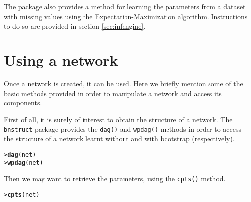 \documentclass{article}\usepackage[]{graphicx}\usepackage[]{color}
\makeatletter
\newcommand{\hlstd}[1]{\textcolor[rgb]{0.345,0.345,0.345}{#1}}%
\newcommand{\hlkwd}[1]{\textcolor[rgb]{0.737,0.353,0.396}{\textbf{#1}}}%
\newenvironment{kframe}{%
 \def\at@end@of@kframe{}%
 \ifinner\ifhmode%
  \def\at@end@of@kframe{\end{minipage}}%
  \begin{minipage}{\columnwidth}%
 \fi\fi%
 \def\FrameCommand##1{\hskip\@totalleftmargin \hskip-\fboxsep
 \colorbox{shadecolor}{##1}\hskip-\fboxsep
     \hskip-\linewidth \hskip-\@totalleftmargin \hskip\columnwidth}%
 \MakeFramed {\advance\hsize-\width
   \@totalleftmargin\z@ \linewidth\hsize
   \@setminipage}}%
 {\par\unskip\endMakeFramed%
 \at@end@of@kframe}
\newenvironment{knitrout}{}{} %
\newcommand{\Robject}[1]{{\texttt{#1}}}
\newcommand{\Rpackage}[1]{{\texttt{#1}}}
\newcommand{\Rmethod}[1]{{\texttt{#1}}}
\makeatother
\begin{document}
The package also provides a method for learning the parameters from a dataset with missing values using the 
Expectation-Maximization algorithm. Instructions to do so are provided in section \ref{sec:infengine}.

% 

\section{Using a network}
Once a network is created, it can be used. Here we briefly mention some of the basic methods provided in order to
manipulate a network and access its components.

First of all, it is surely of interest to obtain the structure of a network. The \Rpackage{bnstruct} package
provides the \Rmethod{dag()} and \Rmethod{wpdag()} methods in order to access the structure of a network learnt without and
with bootstrap (respectively).
\begin{knitrout}
\color{fgcolor}\begin{kframe}
\begin{alltt}
\hlstd{> }\hlkwd{dag}\hlstd{(net)}
\hlstd{> }\hlkwd{wpdag}\hlstd{(net)}
\end{alltt}
\end{kframe}
\end{knitrout}

Then we may want to retrieve the parameters, using the \Rmethod{cpts()} method.
\begin{knitrout}
\color{fgcolor}\begin{kframe}
\begin{alltt}
\hlstd{> }\hlkwd{cpts}\hlstd{(net)}
\end{alltt}
\end{kframe}
\end{knitrout}
\end{document}

